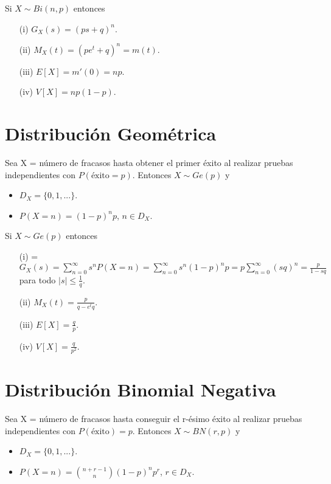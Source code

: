 \begin{obs}
    Si $X \sim Bi(n,p)$ entonces
    \begin{enumerate}
        \item[(i)] $G_X(s) = (ps + q)^n$.
        \item[(ii)] $M_X(t) = (pe^t + q)^n = m(t)$.
        \item[(iii)] $E[X] = m'(0) = np$.
        \item[(iv)] $V[X] = np(1 - p)$.
    \end{enumerate}
\end{obs}

\section{Distribución Geométrica}

\begin{defi}
    Sea X = número de fracasos hasta obtener el primer éxito al realizar pruebas independientes con $P(\text{éxito} = p)$. Entonces $X \sim Ge(p)$ y
    \begin{itemize}
        \item $D_X = \{0,1,...\}$.
        \item $P(X = n) = (1 - p)^np$, $n \in D_X$.
    \end{itemize}
\end{defi}

\begin{obs}
    Si $X \sim Ge(p)$ entonces
    \begin{enumerate}
        \item[(i)] = $G_X(s) = \sum_{n=0}^{\infty}{s^nP(X = n)} = \sum_{n=0}^{\infty}{s^n(1-p)^np} = p\sum_{n=0}^{\infty}{(sq)^n} = \frac{p}{1 - sq}$ para todo $|s| \leq \frac{1}{q}$.
        \item[(ii)] $M_X(t) = \frac{p}{q - e^tq}$.
        \item[(iii)] $E[X] = \frac{q}{p}$.
        \item[(iv)] $V[X] = \frac{q}{p^2}$.
    \end{enumerate}
\end{obs}

\section{Distribución Binomial Negativa}

\begin{defi}
    Sea X = número de fracasos hasta conseguir el r-ésimo éxito al realizar pruebas independientes con $P(\text{éxito}) = p$. Entonces $X \sim BN(r,p)$ y
    \begin{itemize}
        \item $D_X = \{0,1,...\}$.
        \item $P(X = n) = \binom{n + r - 1}{n}(1 - p)^np^r$, $r \in D_X$.
    \end{itemize}
\end{defi}

